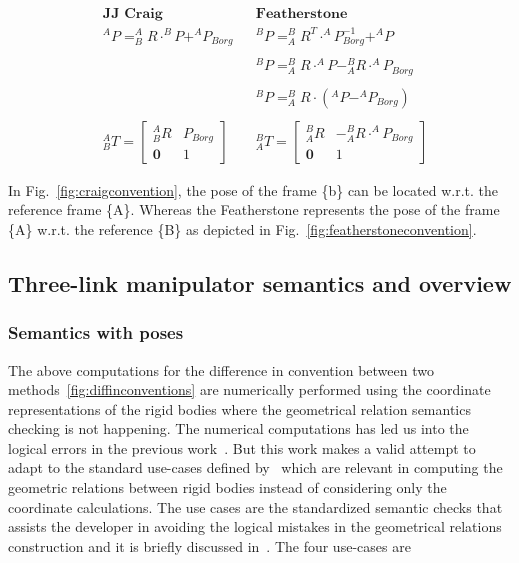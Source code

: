 \begin{align*}
	& \textbf{JJ Craig}&&\textbf{Featherstone} \\
    & ^{{A}}P = ^{{A}}_{{B}}R \cdot ^{{B}}P + ^{A}P_{Borg}&&^{{B}}P = ^{{B}}_{{A}}R^{T} \cdot ^{A}P^{-1}_{Borg} + ^{A}P\nonumber \\ \\
    & && ^{B}P = ^{B}_{A}R\cdot ^{A}P - ^{B}_{A}R\cdot ^{A}P_{Borg} \\ \\
    & && ^{B}P = ^{B}_{A}R\cdot (^{A}P - ^{A}P_{Borg}) \\ \\
    & ^{A}_{B}T = \begin{bmatrix}
    				^{{A}}_{{B}}R & P_{Borg} \\
    				\textbf{0} & 1
				  \end{bmatrix} && ^{B}_{A}T = \begin{bmatrix}
    				^{{B}}_{{A}}R & -^{{B}}_{{A}}R\cdot ^{A}P_{Borg}\\
    				\textbf{0} & 1
				  \end{bmatrix}
\end{align*}

In Fig.~\ref{fig:craigconvention}, the pose of the frame \{b\} can be located w.r.t. the reference frame \{A\}. Whereas the Featherstone represents the pose of the frame \{A\} w.r.t. the reference \{B\} as depicted in Fig.~\ref{fig:featherstoneconvention}. 

\subsection{Three-link manipulator semantics and overview}

\subsubsection*{Semantics with poses}
The above computations for the difference in convention between two methods~\ref{fig:diffinconventions} are numerically performed using the coordinate representations of the rigid bodies where the geometrical relation semantics checking is not happening. The numerical computations has led us into the logical errors in the previous work~\cite{RnD2Rajagopal}. But this work makes a valid attempt to adapt to the standard use-cases defined by~\cite{geometicsemanticspart2} which are relevant in computing the geometric relations between rigid bodies instead of considering only the coordinate calculations. The use cases are the standardized semantic checks that assists the developer in avoiding the logical mistakes in the geometrical relations construction and it is briefly discussed in~\cite{geometicsemanticspart1}. The four use-cases are 

